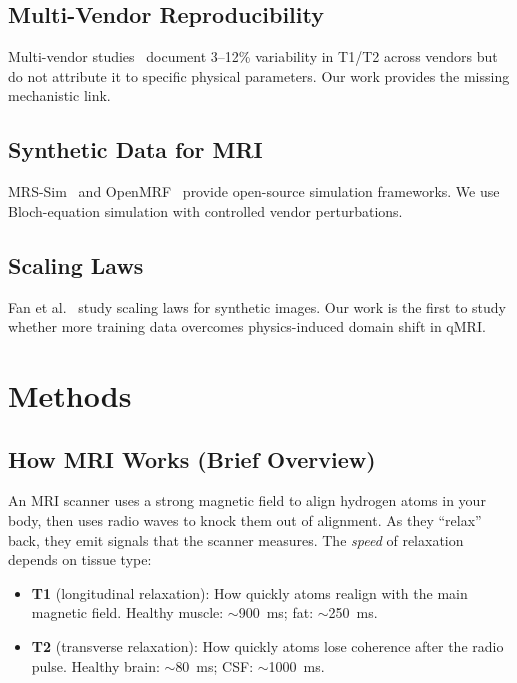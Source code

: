 \documentclass[11pt,a4paper]{article}
\begin{document}
\subsection{Multi-Vendor Reproducibility}
Multi-vendor studies~\cite{captur2020t1,kim2020multivendor} document
3--12\% variability in T1/T2 across vendors but do not attribute it to
specific physical parameters. Our work provides the missing mechanistic
link.

\subsection{Synthetic Data for MRI}
MRS-Sim~\cite{lamaster2025mrs} and OpenMRF~\cite{griesler2026openmrf}
provide open-source simulation frameworks. We use Bloch-equation
simulation with controlled vendor perturbations.

\subsection{Scaling Laws}
Fan et al.~\cite{fan2024scaling} study scaling laws for synthetic
images. Our work is the first to study whether more training data
overcomes physics-induced domain shift in qMRI.


\section{Methods}
\label{sec:methods}

\subsection{How MRI Works (Brief Overview)}

An MRI scanner uses a strong magnetic field to align hydrogen atoms in
your body, then uses radio waves to knock them out of alignment. As
they ``relax'' back, they emit signals that the scanner measures. The
\emph{speed} of relaxation depends on tissue type:
\begin{itemize}
  \item \textbf{T1} (longitudinal relaxation): How quickly atoms realign
    with the main magnetic field. Healthy muscle: $\sim$900~ms; fat:
    $\sim$250~ms.
  \item \textbf{T2} (transverse relaxation): How quickly atoms lose
    coherence after the radio pulse. Healthy brain: $\sim$80~ms;
    CSF: $\sim$1000~ms.
\end{itemize}
\end{document}
